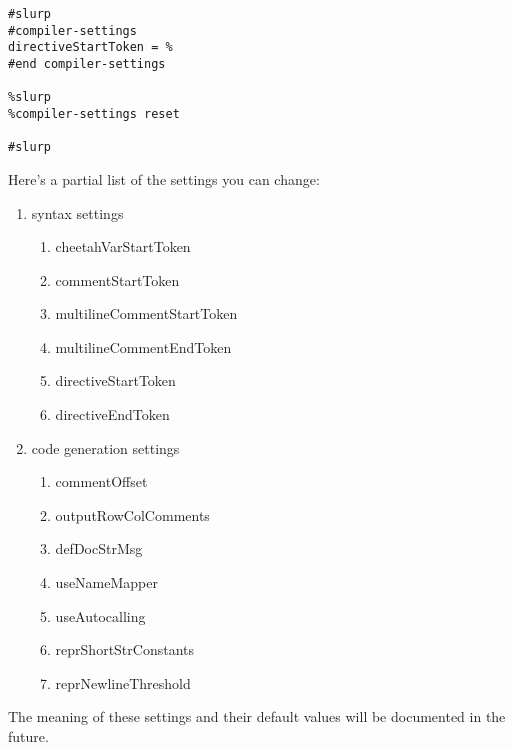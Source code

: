 \begin{verbatim}
#slurp
#compiler-settings
directiveStartToken = %
#end compiler-settings

%slurp
%compiler-settings reset

#slurp
\end{verbatim}

Here's a partial list of the settings you can change:
\begin{enumerate}
\item syntax settings
     \begin{enumerate}
     \item cheetahVarStartToken
     \item commentStartToken
     \item multilineCommentStartToken
     \item multilineCommentEndToken
     \item directiveStartToken
     \item directiveEndToken
     \end{enumerate}
\item code generation settings
     \begin{enumerate}
     \item commentOffset
     \item outputRowColComments
     \item defDocStrMsg
     \item useNameMapper
     \item useAutocalling
     \item reprShortStrConstants
     \item reprNewlineThreshold
     \end{enumerate}
\end{enumerate}
The meaning of these settings and their default values will be documented in
the future.







